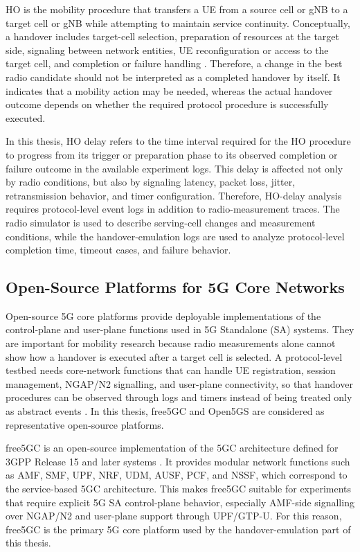 HO is the mobility procedure that transfers a UE from a source cell or gNB to a target cell or gNB while attempting to maintain service continuity. Conceptually, a handover includes target-cell selection, preparation of resources at the target side, signaling between network entities, UE reconfiguration or access to the target cell, and completion or failure handling \cite{3gpp_38300}. Therefore, a change in the best radio candidate should not be interpreted as a completed handover by itself. It indicates that a mobility action may be needed, whereas the actual handover outcome depends on whether the required protocol procedure is successfully executed.

In this thesis, HO delay refers to the time interval required for the HO procedure to progress from its trigger or preparation phase to its observed completion or failure outcome in the available experiment logs. This delay is affected not only by radio conditions, but also by signaling latency, packet loss, jitter, retransmission behavior, and timer configuration. Therefore, HO-delay analysis requires protocol-level event logs in addition to radio-measurement traces. The radio simulator is used to describe serving-cell changes and measurement conditions, while the handover-emulation logs are used to analyze protocol-level completion time, timeout cases, and failure behavior.

\subsection{Open-Source Platforms for 5G Core Networks}

Open-source 5G core platforms provide deployable implementations of the control-plane and user-plane functions used in 5G Standalone (SA) systems. They are important for mobility research because radio measurements alone cannot show how a handover is executed after a target cell is selected. A protocol-level testbed needs core-network functions that can handle UE registration, session management, NGAP/N2 signalling, and user-plane connectivity, so that handover procedures can be observed through logs and timers instead of being treated only as abstract events \cite{3gpp_38300}. In this thesis, free5GC and Open5GS are considered as representative open-source platforms.

free5GC is an open-source implementation of the 5GC architecture defined for 3GPP Release 15 and later systems \cite{free5gc_project}. It provides modular network functions such as AMF, SMF, UPF, NRF, UDM, AUSF, PCF, and NSSF, which correspond to the service-based 5GC architecture. This makes free5GC suitable for experiments that require explicit 5G SA control-plane behavior, especially AMF-side signalling over NGAP/N2 and user-plane support through UPF/GTP-U. For this reason, free5GC is the primary 5G core platform used by the handover-emulation part of this thesis.

